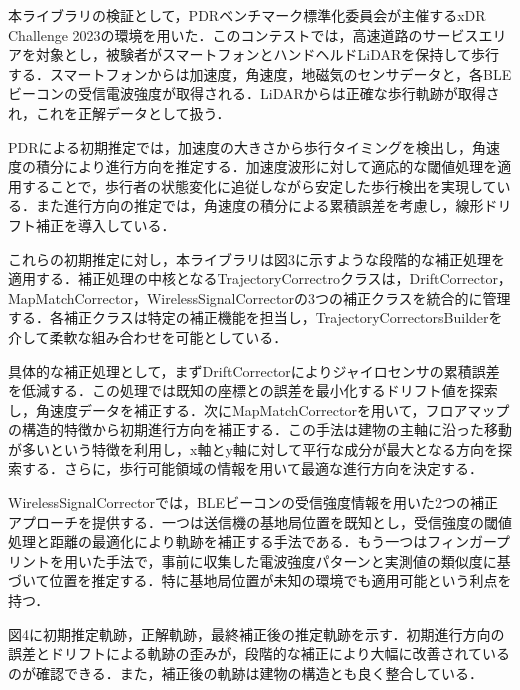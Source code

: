 \documentclass[a4paper, 10pt, twocolumn]{jarticle}
\begin{document}
本ライブラリの検証として，PDRベンチマーク標準化委員会が主催するxDR Challenge 2023の環境を用いた．このコンテストでは，高速道路のサービスエリアを対象とし，被験者がスマートフォンとハンドヘルドLiDARを保持して歩行する．スマートフォンからは加速度，角速度，地磁気のセンサデータと，各BLEビーコンの受信電波強度が取得される．LiDARからは正確な歩行軌跡が取得され，これを正解データとして扱う．

PDRによる初期推定では，加速度の大きさから歩行タイミングを検出し，角速度の積分により進行方向を推定する．加速度波形に対して適応的な閾値処理を適用することで，歩行者の状態変化に追従しながら安定した歩行検出を実現している．また進行方向の推定では，角速度の積分による累積誤差を考慮し，線形ドリフト補正を導入している．

これらの初期推定に対し，本ライブラリは図3に示すような段階的な補正処理を適用する．補正処理の中核となるTrajectoryCorrectroクラスは，DriftCorrector，MapMatchCorrector，WirelessSignalCorrectorの3つの補正クラスを統合的に管理する．各補正クラスは特定の補正機能を担当し，TrajectoryCorrectorsBuilderを介して柔軟な組み合わせを可能としている．

具体的な補正処理として，まずDriftCorrectorによりジャイロセンサの累積誤差を低減する．この処理では既知の座標との誤差を最小化するドリフト値を探索し，角速度データを補正する．次にMapMatchCorrectorを用いて，フロアマップの構造的特徴から初期進行方向を補正する．この手法は建物の主軸に沿った移動が多いという特徴を利用し，x軸とy軸に対して平行な成分が最大となる方向を探索する．さらに，歩行可能領域の情報を用いて最適な進行方向を決定する．

WirelessSignalCorrectorでは，BLEビーコンの受信強度情報を用いた2つの補正アプローチを提供する．一つは送信機の基地局位置を既知とし，受信強度の閾値処理と距離の最適化により軌跡を補正する手法である．もう一つはフィンガープリントを用いた手法で，事前に収集した電波強度パターンと実測値の類似度に基づいて位置を推定する．特に基地局位置が未知の環境でも適用可能という利点を持つ．

図4に初期推定軌跡，正解軌跡，最終補正後の推定軌跡を示す．初期進行方向の誤差とドリフトによる軌跡の歪みが，段階的な補正により大幅に改善されているのが確認できる．また，補正後の軌跡は建物の構造とも良く整合している．
\end{document}
